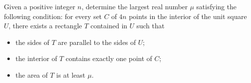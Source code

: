 Given a positive integer $n$, determine the largest real number $\mu$ satisfying the following condition: for every set $C$ of $4n$ points in the interior of the unit square $U$, there exists a rectangle $T$ contained in $U$ such that
\begin{itemize}
	\item the sides of $T$ are parallel to the sides of $U$;
	\item the interior of $T$ contains exactly one point of $C$;
	\item the area of $T$ is at least $\mu$.
\end{itemize}